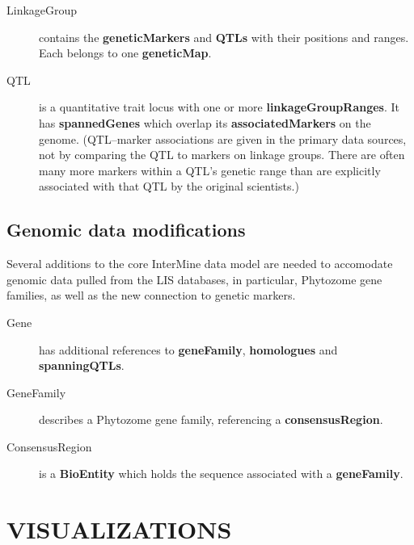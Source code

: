 \documentclass[]{pagposter}
\begin{document}
\begin{multicols*}{3}
\begin{description}
    \item[LinkageGroup] contains the \textbf{geneticMarkers} and \textbf{QTLs} with their positions and ranges. Each belongs to one \textbf{geneticMap}.
      
    \item[QTL] is a quantitative trait locus with one or more \textbf{linkageGroupRanges}. It has \textbf{spannedGenes} which overlap its \textbf{associatedMarkers} on the genome.
      (QTL--marker associations are given in the primary data sources, not by comparing the QTL to markers on linkage groups. There are often many more markers within a QTL's genetic range than are explicitly
      associated with that QTL by the original scientists.)

  \end{description}

  \subsection*{Genomic data modifications}

  Several additions to the core InterMine data model are needed to accomodate genomic data pulled from the LIS databases, in particular, Phytozome gene families, as well as the new connection to genetic markers.

  \begin{description}

    \item[Gene] has additional references to \textbf{geneFamily}, \textbf{homologues} and \textbf{spanningQTLs}.

    \item[GeneFamily] describes a Phytozome gene family, referencing a \textbf{consensusRegion}.

    \item[ConsensusRegion] is a \textbf{BioEntity} which holds the sequence associated with a \textbf{geneFamily}.

  \end{description}


  \section*{VISUALIZATIONS}


\end{multicols*}
\end{document}
